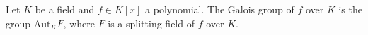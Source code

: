 Let $K$ be a field and $f \in K[x]$ a polynomial. The Galois group of $f$ over $K$ is the group $\mathrm{Aut}_K F$, where $F$ is a splitting field of $f$ over $K$.
